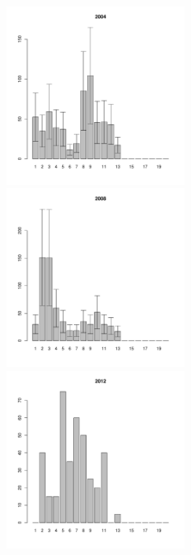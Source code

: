 \documentclass[12pt, a4paper]{article}
\begin{document}
\begin{figure}[h]

\begin{multicols}{3}
\hfill
\includegraphics[width=60mm]{../White_Sea/Luvenga_Goreliy/midlow_2004_.pdf}
\hfill
\includegraphics[width=60mm]{../White_Sea/Luvenga_Goreliy/midlow_2008_.pdf}
\hfill
\includegraphics[width=60mm]{../White_Sea/Luvenga_Goreliy/midlow_2012_.pdf}
\end{multicols}




\end{figure}
\end{document}
